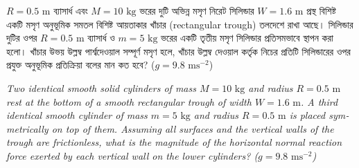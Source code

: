 \documentclass[12pt, a4paper]{article}
\begin{document}
\begin{tcolorbox}[questionbox={প্রশ্ন (Question) 43}]
    \noindent
    $R = 0.5\text{ m}$ ব্যাসার্ধ এবং $M = 10\text{ kg}$ ভরের দুটি অভিন্ন মসৃণ নিরেট সিলিন্ডার $W = 1.6\text{ m}$ প্রস্থ বিশিষ্ট একটি মসৃণ অনুভূমিক সমতল বিশিষ্ট আয়তাকার খাঁচার (rectangular trough) তলদেশে রাখা আছে। সিলিন্ডার দুটির ওপর $R = 0.5\text{ m}$ ব্যাসার্ধ ও $m = 5\text{ kg}$ ভরের একটি তৃতীয় মসৃণ সিলিন্ডার প্রতিসমভাবে স্থাপন করা হলো। খাঁচার উভয় উল্লম্ব পার্শ্বদেওয়াল সম্পূর্ণ মসৃণ হলে, খাঁচার উল্লম্ব দেওয়াল কর্তৃক নিচের প্রতিটি সিলিন্ডারের ওপর প্রযুক্ত অনুভূমিক প্রতিক্রিয়া বলের মান কত হবে? ($g = 9.8\text{ ms}^{-2}$)
    
    \vspace{0.8em}
    \begin{english}
    \noindent\textit{\color{darkgray}
    Two identical smooth solid cylinders of mass $M = 10\text{ kg}$ and radius $R = 0.5\text{ m}$ rest at the bottom of a smooth rectangular trough of width $W = 1.6\text{ m}$. A third identical smooth cylinder of mass $m = 5\text{ kg}$ and radius $R = 0.5\text{ m}$ is placed symmetrically on top of them. Assuming all surfaces and the vertical walls of the trough are frictionless, what is the magnitude of the horizontal normal reaction force exerted by each vertical wall on the lower cylinders? ($g = 9.8\text{ ms}^{-2}$)
    }
    \end{english}
\end{tcolorbox}

\vspace{1em}
\begin{center}
\end{center}
\vspace{1em}
\end{document}
